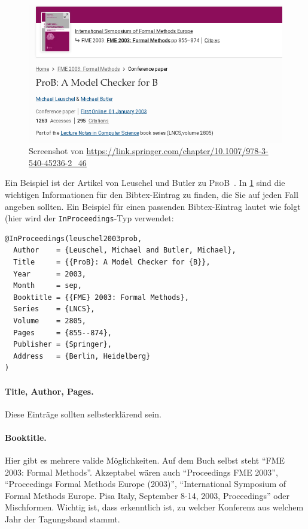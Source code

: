 \begin{figure}
    \centering
    \includegraphics[scale=.5]{fig/prob-springer.png}
    \caption{Screenshot von \url{https://link.springer.com/chapter/10.1007/978-3-540-45236-2_46}}
    \label{fig:prob-springer}
\end{figure}

Ein Beispiel ist der Artikel von Leuschel und Butler zu \textsc{ProB}~\cite{leuschel2003prob}.
In \cref{fig:prob-springer} sind die wichtigen Informationen für den Bibtex-Eintrag zu finden,
die Sie auf jeden Fall angeben sollten.
Ein Beispiel für einen passenden Bibtex-Eintrag lautet wie folgt (hier wird der \verb|InProceedings|-Typ verwendet:

\begin{verbatim}
@InProceedings(leuschel2003prob,
  Author	= {Leuschel, Michael and Butler, Michael},
  Title		= {{ProB}: A Model Checker for {B}},
  Year		= 2003,
  Month		= sep,
  Booktitle	= {{FME} 2003: Formal Methods},
  Series	= {LNCS},
  Volume	= 2805,
  Pages		= {855--874},
  Publisher	= {Springer},
  Address	= {Berlin, Heidelberg}
)
\end{verbatim}

\paragraph{Title, Author, Pages.} Diese Einträge sollten selbsterklärend sein.
\paragraph{Booktitle.} Hier gibt es mehrere valide Möglichkeiten.
Auf dem Buch selbst steht \enquote{FME 2003: Formal Methods}.
Akzeptabel wären auch \enquote{Proceedings FME 2003},
\enquote{Proceedings Formal Methods Europe (2003)},
\enquote{International Symposium of Formal Methods Europe. Pisa Italy, September 8-14, 2003, Proceedings}
oder Mischformen.
Wichtig ist, dass erkenntlich ist, zu welcher Konferenz aus welchem Jahr der Tagungsband stammt.

